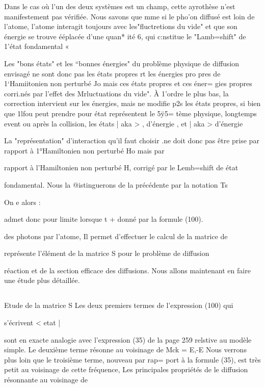 Dans le cas où l'un des deux systèmes est un champ, cette ayrothèse n'est manifestement pas vérifiée. Nous savons que mme si le pho’on
diffusé est loin de l’atome, l'atome interagit toujours avec les"fluctretions
du vide" et que son énergie se trouve ééplacée d'une quan* ité 6, qui c:nstitue
le "Lamb=shift" de 1'état fondamental «

Les "bons états" et les “bonnes énergies" du problème physique
de diffusion envisagé ne sont donc pas les états propres rt les énergies pro
pres de 1‘Hamiitonien non perturbé Jo mais ces états propres et ces éner=
gies propres corri.nés par l'effet des Mrluctuations du vide". À 1'ordre le
plus bas, la correction intervient sur les énergies, mais ne modifie p2s les
états propres, si bien que 1lfou peut prendre pour état représentent le 5ÿ5=
tème physique, longtemps event ou après la collision, les états | aka > ,
d'énergie , et | aka > d'énergie 

La "représentation" d'interaction qu'il faut choisir .ne doit
donc pas être prise par rapport à 1°Hamiltonien non perturbé Ho mais par

rapport à l'Hamiltonien non perturbé H, corrigé par le Lemb=shift de état


fondamental. Nous la @istinguerons de la précédente par la notation Ts

On e alors :

 admet donc pour limite lorsque t +
 donné par la formule (100).

des photons par l'atome, Il permet d'effectuer le calcul de la matrice de

représente l'élément de la matrice S pour le problème de diffusion

réaction et de la section efficace des diffusions.
Nous allons maintenant en faire une étude plus détaillée.

\subsection{} Etude de la matrice S%
Les deux premiers termes de l'expression (100) qui

s'écrivent
< etat |

sont en exacte analogie avec l'expression (35) de la page 259 relstive au
modèle simple. Le deuxième terme résonne au voisinage de Mck = E,-E
Nous verrons plus loin que le troisième terme, nouveau par rap=
port à la formule (35), est très petit au voisinage de cette fréquence, Les
principales propriétés de le diffusion résonnante au voisinage de


